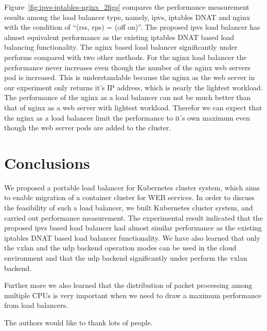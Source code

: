 Figure~\ref{fig:ipvs-iptables-nginx_2figs} compares the performance measurement results 
among the load balancer type, namely, ipvs, iptables DNAT and nginx 
with the condition of \enquote{(rss, rps) = (off on)}.
The proposed ipvs load balancer has almost equivalent performance as the existing iptables 
DNAT based load balancing functionality. 
The nginx based load balancer significantly under performs compared with two other methods.
For the nginx load balancer the performance never increases even though the number of the 
nginx web servers pod is increased.
This is understandable because the nginx as the web server in our experiment only 
returns it's IP address, which is nearly the lightest workload.
The performance of the nginx as a load balancer can not be much better than that of nginx as a web server 
with lightest workload.
Therefor we can expect that the nginx as a load balancer limit the performance to it's own maximum 
even though the web server pods are added to the cluster.

\section{Conclusions}\label{Conclusions}

We proposed a portable load balancer for Kubernetes cluster system, 
which aims to enable migration of a container cluster for WEB services.
In order to discuss the feasibility of such a load balancer, we built 
Kubernetes cluster system, and carried out performance measurement.
The experimental result indicated that the proposed ipvs based load balancer
had almost similar performance as the existing iptables DNAT based load balancer functionality.
We have also learned that only the vxlan and the udp backend operation modes can be used 
in the cloud environment and that the udp backend significantly under perform the vxlan backend.

Further more we also learned that the distribution of packet processing among multiple CPUs is very important
when we need to draw a maximum performance from load balancers.




\begin{acks}
  The authors would like to thank lots of people.

\end{acks}
